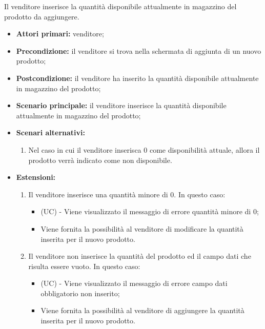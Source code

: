 Il venditore inserisce la quantità disponibile attualmente in magazzino del prodotto da aggiungere.
\begin{itemize}
    \item \textbf{Attori primari:} venditore;
    \item \textbf{Precondizione:} il venditore si trova nella schermata di aggiunta di un nuovo prodotto;
    \item \textbf{Postcondizione:} il venditore ha inserito la quantità disponibile attualmente in magazzino del prodotto;
    \item \textbf{Scenario principale:} il venditore inserisce la quantità disponibile attualmente in magazzino del prodotto;
    \item \textbf{Scenari alternativi:}
    \begin{enumerate}[label=\lett]
    	\item Nel caso in cui il venditore inserisca 0 come disponibilità attuale, allora il prodotto verrà indicato come non disponibile.
    \end{enumerate}
    \item \textbf{Estensioni:}
    \begin{enumerate}[label=\lett]
    	\item Il venditore inserisce una quantità minore di 0. In questo caso:
    	\begin{itemize}
    		\item (UC) - Viene visualizzato il messaggio di errore quantità minore di 0;
    		\item Viene fornita la possibilità al venditore di modificare la quantità inserita per il nuovo prodotto.
    	\end{itemize}
    	\item Il venditore non inserisce la quantità del prodotto ed il campo dati che risulta essere vuoto. In questo caso:
    	\begin{itemize}
    		\item (UC) - Viene visualizzato il messaggio di errore campo dati obbligatorio non inserito;
    		\item Viene fornita la possibilità al venditore di aggiungere la quantità inserita per il nuovo prodotto.
    	\end{itemize}
    \end{enumerate}
\end{itemize}

